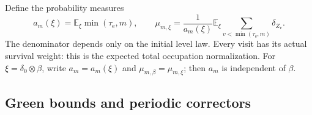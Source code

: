 \documentclass[11pt]{amsart}
\theoremstyle{definition}
\theoremstyle{remark}
\newcommand{\E}{\mathbb E}
\begin{document}
Define the probability measures
\begin{equation}
 a_m(\xi)=\E_\xi\min(\tau_{\mathrm e},m),\qquad
 \mu_{m,\xi}=\frac1{a_m(\xi)}\E_\xi
       \sum_{v<\min(\tau_{\mathrm e},m)}\delta_{Z_v}.
 \label{occ:occupation}
\end{equation}
The denominator depends only on the initial level law.  Every visit
has its actual survival weight: this is the expected total occupation
normalization.  For $\xi=\delta_0\otimes\beta$, write
$a_m=a_m(\xi)$ and $\mu_{m,\beta}=\mu_{m,\xi}$; then $a_m$ is
independent of $\beta$.

\subsection{Green bounds and periodic correctors}
\label{occ:level-subsection}
\end{document}
